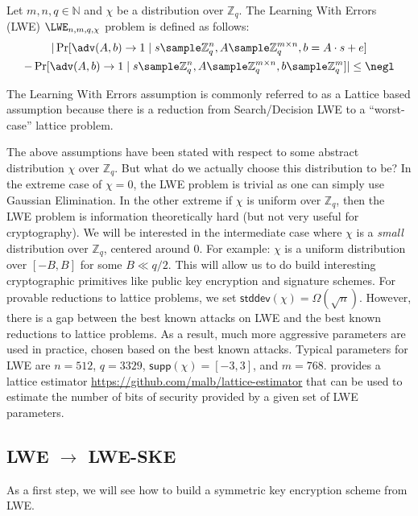 \begin{definition}
    Let $m,n,q \in \mathbb{N}$ and $\chi$ be a distribution over $\mathbb{Z}_q$. The Learning With Errors (LWE) $\LWE_{n,m,q,\chi}$ problem is defined as follows:
    \begin{multline*}
        |\Pr[\adv(A,b) \to 1 \mid s \sample \mathbb{Z}_q^n, A \sample \mathbb{Z}_q^{m \times n}, b = A \cdot s + e ] \\
        - \Pr[\adv(A,b) \to 1 \mid s \sample \mathbb{Z}_q^n, A \sample \mathbb{Z}_q^{m \times n}, b \sample \mathbb{Z}_q^m ]|\leq \negl
    \end{multline*}
\end{definition}
The Learning With Errors assumption is commonly referred to as a Lattice based assumption because there is a reduction from Search/Decision LWE to a ``worst-case'' lattice problem.

The above assumptions have been stated with respect to some abstract distribution $\chi$ over $\mathbb{Z}_q$. But what do we actually choose this distribution to be? In the extreme case of $\chi = 0$, the LWE problem is trivial as one can simply use Gaussian Elimination. In the other extreme if $\chi$ is uniform over $\mathbb{Z}_q$, then the LWE problem is information theoretically hard (but not very useful for cryptography). We will be interested in the intermediate case where $\chi$ is a \emph{small} distribution over $\mathbb{Z}_q$, centered around 0. For example: $\chi$ is a uniform distribution over $[-B, B]$ for some $B \ll q/2$. This will allow us to do build interesting cryptographic primitives like public key encryption and signature schemes. For provable reductions to lattice problems, we set $\mathsf{stddev}(\chi) = \Omega(\sqrt{n})$. However, there is a gap between the best known attacks on LWE and the best known reductions to lattice problems. As a result, much more aggressive parameters are used in practice, chosen based on the best known attacks. Typical parameters for LWE are $n = 512$, $q = 3329$, $\mathsf{supp}(\chi) = [-3,3]$, and $m = 768$. \cite{EPRINT:AlbPlaSco15} provides a lattice estimator \url{https://github.com/malb/lattice-estimator} that can be used to estimate the number of bits of security provided by a given set of LWE parameters.

\subsection{LWE $\to$ LWE-SKE}
As a first step, we will see how to build a symmetric key encryption scheme from LWE.

